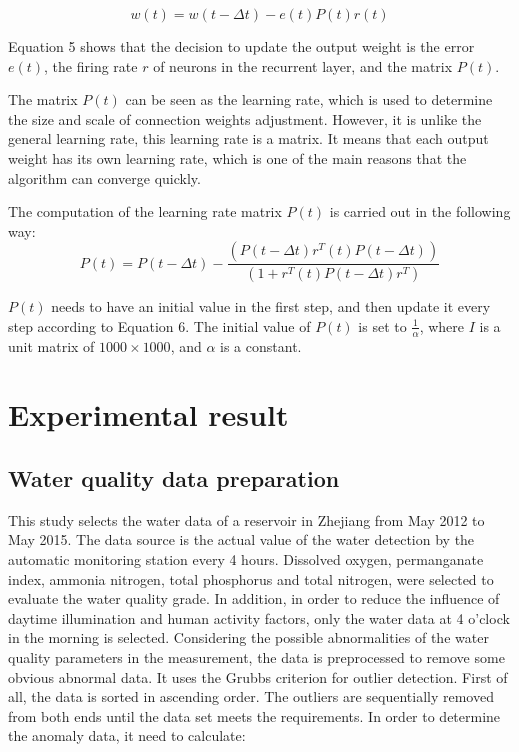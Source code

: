 \documentclass[runningheads]{llncs}
\begin{document}
\begin{equation}
w(t)= w(t -\Delta t)  - e(t)P(t)r(t)
\end{equation}

Equation 5 shows that the decision to update the output weight is the 
error $e(t)$, the firing rate $r$ of neurons in  the recurrent layer, 
and the matrix $P(t)$.

The  matrix $P(t)$ can be seen as the learning rate, which is used 
to determine the size and scale of connection weights adjustment. However, it is
unlike the general learning rate, this learning rate is a matrix. 
It means that each output weight has its own learning rate, 
which is one of the main reasons that the algorithm can converge quickly.

The computation of the learning rate matrix $P(t)$ is carried out in the following way:
\begin{equation}
P(t)  = P(t-\Delta t)-  \frac{(P(t-\Delta t) r^T (t)P(t-\Delta t))}{(1+r^T (t)P(t-\Delta t) r^T )}
\end{equation}

$P(t)$ needs to have an initial value in the first step,  
and then update it every step according to Equation 6. 
The initial value of $P(t)$ is set to $\frac{1}{\alpha}$, where $I$ is a unit matrix of $1000\times 1000$,
and $\alpha$ is a constant.


\section{Experimental result}
\subsection{Water quality data preparation}
This study selects the water data of a reservoir in Zhejiang 
from May 2012 to May 2015. The data source is the actual value of 
the water detection by the automatic monitoring station every 4 hours.
Dissolved oxygen, permanganate index, ammonia nitrogen, total phosphorus
and total nitrogen, were selected to evaluate the water quality grade. 
In addition, in order to reduce the influence of daytime illumination 
and human activity factors, only the water data at 4 o'clock 
in the morning  is selected. 
Considering the possible abnormalities of the water quality 
parameters in the measurement, the data is preprocessed to remove 
some obvious abnormal data. It uses the Grubbs criterion for outlier 
detection. First of all, the data is sorted in ascending order. 
The outliers are sequentially removed from both ends until the data 
set meets the requirements. In order to determine the anomaly data, 
it need to calculate:
\end{document}
